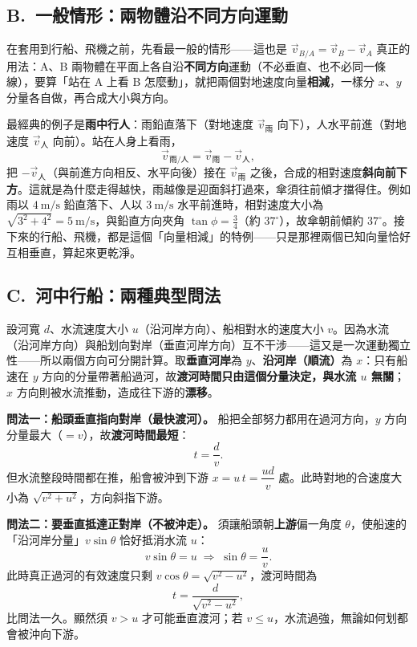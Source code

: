 \documentclass[11pt]{article}
\begin{document}
\subsection*{\sffamily B.\ 一般情形：兩物體沿不同方向運動}

在套用到行船、飛機之前，先看最一般的情形——這也是 $\vec v_{B/A}=\vec v_B-\vec v_A$ 真正的用法：A、B 兩物體在平面上各自沿\textbf{不同方向}運動（不必垂直、也不必同一條線），要算「站在 A 上看 B 怎麼動」，就把兩個對地速度向量\textbf{相減}，一樣分 $x$、$y$ 分量各自做，再合成大小與方向。

最經典的例子是\textbf{雨中行人}：雨鉛直落下（對地速度 $\vec v_{\text{雨}}$ 向下），人水平前進（對地速度 $\vec v_{\text{人}}$ 向前）。站在人身上看雨，
$$\vec v_{\text{雨/人}}=\vec v_{\text{雨}}-\vec v_{\text{人}},$$
把 $-\vec v_{\text{人}}$（與前進方向相反、水平向後）接在 $\vec v_{\text{雨}}$ 之後，合成的相對速度\textbf{斜向前下方}。這就是為什麼走得越快，雨越像是迎面斜打過來，傘須往前傾才擋得住。例如雨以 $4\ \text{m/s}$ 鉛直落下、人以 $3\ \text{m/s}$ 水平前進時，相對速度大小為 $\sqrt{3^2+4^2}=5\ \text{m/s}$，與鉛直方向夾角 $\tan\phi=\tfrac34$（約 $37^\circ$），故傘朝前傾約 $37^\circ$。接下來的行船、飛機，都是這個「向量相減」的特例——只是那裡兩個已知向量恰好互相垂直，算起來更乾淨。


\subsection*{\sffamily C.\ 河中行船：兩種典型問法}

設河寬 $d$、水流速度大小 $u$（沿河岸方向）、船相對水的速度大小 $v$。因為水流（沿河岸方向）與船划向對岸（垂直河岸方向）互不干涉——這又是一次運動獨立性——所以兩個方向可分開計算。取\textbf{垂直河岸}為 $y$、\textbf{沿河岸（順流）}為 $x$：只有船速在 $y$ 方向的分量帶著船過河，故\textbf{渡河時間只由這個分量決定，與水流 $u$ 無關}；$x$ 方向則被水流推動，造成往下游的\textbf{漂移}。

\textbf{問法一：船頭垂直指向對岸（最快渡河）。} 船把全部努力都用在過河方向，$y$ 方向分量最大（$=v$），故\textbf{渡河時間最短}：
$$t=\frac{d}{v}.$$
但水流整段時間都在推，船會被沖到下游 $x=u\,t=\dfrac{ud}{v}$ 處。此時對地的合速度大小為 $\sqrt{v^2+u^2}$，方向斜指下游。

\textbf{問法二：要垂直抵達正對岸（不被沖走）。} 須讓船頭朝\textbf{上游}偏一角度 $\theta$，使船速的「沿河岸分量」$v\sin\theta$ 恰好抵消水流 $u$：
$$v\sin\theta=u\;\Rightarrow\;\sin\theta=\frac{u}{v}.$$
此時真正過河的有效速度只剩 $v\cos\theta=\sqrt{v^2-u^2}$，渡河時間為
$$t=\frac{d}{\sqrt{v^2-u^2}},$$
比問法一久。顯然須 $v>u$ 才可能垂直渡河；若 $v\le u$，水流過強，無論如何划都會被沖向下游。
\end{document}
